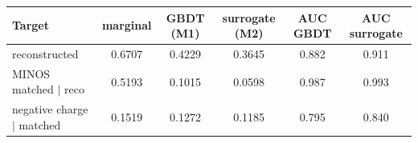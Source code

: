\begin{tabular}{lccccc}
\toprule
Target & marginal & GBDT (M1) & surrogate (M2) & AUC GBDT & AUC surrogate \\
\midrule
reconstructed & 0.6707 & 0.4229 & 0.3645 & 0.882 & 0.911 \\
MINOS matched $\mid$ reco & 0.5193 & 0.1015 & 0.0598 & 0.987 & 0.993 \\
negative charge $\mid$ matched & 0.1519 & 0.1272 & 0.1185 & 0.795 & 0.840 \\
\bottomrule
\end{tabular}
